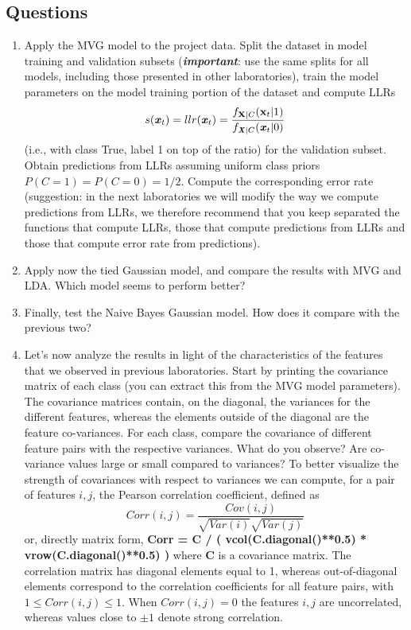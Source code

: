 \documentclass[a4paper, 12pt, english]{article}
\begin{document}
    \subsection{Questions}
    \begin{enumerate}
        \item Apply the MVG model to the project data. Split the dataset in model training and validation subsets (\textbf{\textit{important}}: use the same splits for all models, including those presented in other laboratories), train the model parameters on the model training portion of the dataset and compute LLRs
        \[ s(\textbf{\textit{x}}_t) = llr(\textbf{\textit{x}}_t) =\dfrac{f_{\textbf{X}|C}(\textbf{x}_t|1)}{f_{\textbf{\textit{X}}|C}(\textbf{\textit{x}}_t|0)}\]
        (i.e., with class True, label 1 on top of the ratio) for the validation subset. Obtain predictions from LLRs assuming uniform class priors \(P(C = 1) = P(C = 0) = 1/2 \). Compute the corresponding error rate (suggestion: in the next laboratories we will modify the way we compute predictions from LLRs, we therefore recommend that you keep separated the functions that compute LLRs, those that compute predictions from LLRs and those that compute error rate from predictions).
        \item Apply now the tied Gaussian model, and compare the results with MVG and LDA. Which model seems to perform better?
        \item Finally, test the Naive Bayes Gaussian model. How does it compare with the previous two?
        \item Let’s now analyze the results in light of the characteristics of the features that we observed in previous laboratories. Start by printing the covariance matrix of each class (you can extract this from the MVG model parameters). The covariance matrices contain, on the diagonal, the variances for the different features, whereas the elements outside of the diagonal are the feature co-variances. For each class, compare the covariance of different feature pairs with the respective variances. What do you observe? Are co-variance values large or small compared to variances? To better visualize the strength of covariances with respect to variances we can compute, for a pair of features \(i, j\), the Pearson correlation coefficient, defined as
        \[ Corr(i,j) = \dfrac{Cov(i,j)}{\sqrt{Var(i)}\sqrt{Var(j)}}  \]
        or, directly matrix form,
        \textbf{Corr = C / ( vcol(C.diagonal()**0.5) * vrow(C.diagonal()**0.5) )}
        where \textbf{C} is a covariance matrix. The correlation matrix has diagonal elements equal to 1, whereas out-of-diagonal elements correspond to the correlation coefficients for all feature pairs, with \(1 \le Corr(i,j) \le 1\). When \(Corr(i,j) = 0\) the features \(i,j\) are uncorrelated, whereas values close to \(\pm1\) denote strong correlation.

\end{enumerate}
\end{document}
